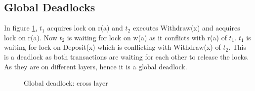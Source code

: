 \documentclass[12pt]{article}
\begin{document}
\subsection*{Global Deadlocks}
In figure \ref{fig:d2}, $t_1$ acquires lock on r(a) and $t_2$ executes Withdraw(x) and acquires lock on r(a). Now $t_2$ is waiting for lock on w(a) as it conflicts with r(a) of $t_1$.
$t_1$ is waiting for lock on Deposit(x) which is conflicting with Withdraw(x) of $t_2$.
This is a deadlock as both transactions are waiting for each other to release the locks. As they are on different layers, hence it is a global deadlock.
\begin{figure}[h]
    \centering
    \caption{Global deadlock: cross layer}
    \label{fig:d2}
\end{figure}
\end{document}
